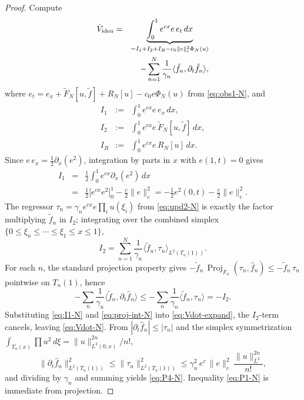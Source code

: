 \documentclass[journal,twoside,web]{ieeecolor}
\DeclareMathOperator{\Proj}{Proj}
\begin{document}
\begin{proof}
Compute
\begin{eqnarray}
\dot V_{\rm iden} &=& \underbrace{\int_0^1 e^{cx}e\,e_t\,dx}_{=I_1+I_2+I_R-c_0\|e\|_c^2\Phi_N(u)} \nonumber\\
&& -\sum_{n=1}^N\frac{1}{\gamma_n}\langle\tilde f_n,\partial_t\hat f_n\rangle, \label{eq:Vdot-expand}
\end{eqnarray}
where $e_t=e_x+\tilde F_N[u,\tilde f]+R_N[u]-c_0 e\Phi_N(u)$ from \eqref{eq:obs1-N}, and
\begin{eqnarray}
I_1 &:=& \int_0^1 e^{cx}e\,e_x\,dx, \nonumber\\
I_2 &:=& \int_0^1 e^{cx}e\,\tilde F_N[u,\tilde f]\,dx, \nonumber\\
I_R &:=& \int_0^1 e^{cx}e\,R_N[u]\,dx. \label{eq:I123-def}
\end{eqnarray}
 Since $e\,e_x=\tfrac12\partial_x(e^2)$, integration by parts in $x$ with $e(1,t)=0$ gives
\begin{eqnarray}
I_1 &=& \tfrac12\int_0^1 e^{cx}\partial_x(e^2)\,dx \nonumber\\
&=& \tfrac12\bigl[e^{cx}e^2\bigr]_0^1-\tfrac{c}{2}\|e\|_c^2=-\tfrac12 e^2(0,t)-\tfrac{c}{2}\|e\|_c^2. \label{eq:I1-N}
\end{eqnarray}
 The regressor $\tau_n=\gamma_n e^{cx}e\prod_i u(\xi_i)$ from \eqref{eq:upd2-N} is exactly the factor multiplying $\tilde f_n$ in $I_2$; integrating over the combined simplex $\{0\le\xi_n\le\cdots\le\xi_1\le x\le 1\}$,
\begin{equation}\label{eq:I2-N}
I_2=\sum_{n=1}^N\frac{1}{\gamma_n}\langle\tilde f_n,\tau_n\rangle_{L^2(T_n(1))}.
\end{equation}
 For each $n$, the standard projection property gives $-\tilde f_n\,\Proj_{\bar F_n}(\tau_n,\hat f_n)\le-\tilde f_n\,\tau_n$ pointwise on $T_n(1)$, hence
\begin{equation}\label{eq:proj-int-N}
-\sum_n\frac{1}{\gamma_n}\langle\tilde f_n,\partial_t\hat f_n\rangle\le-\sum_n\frac{1}{\gamma_n}\langle\tilde f_n,\tau_n\rangle=-I_2.
\end{equation}
 Substituting \eqref{eq:I1-N} and \eqref{eq:proj-int-N} into \eqref{eq:Vdot-expand}, the $I_2$-term cancels, leaving \eqref{eq:Vdot-N}.
 From $|\partial_t\hat f_n|\le|\tau_n|$ and the simplex symmetrization $\int_{T_n(x)}\prod u^2\,d\xi=\|u\|^{2n}_{L^2(0,x)}/n!$,
\begin{equation}\label{eq:tau-bound}
\|\partial_t\hat f_n\|^2_{L^2(T_n(1))}\le\|\tau_n\|^2_{L^2(T_n(1))}\le \gamma_n^2\,e^c\,\|e\|_c^2\,\frac{\|u\|^{2n}_{L^2}}{n!},
\end{equation}
and dividing by $\gamma_n$ and summing yields \eqref{eq:P4-N}. Inequality \eqref{eq:P1-N} is immediate from  projection.
\end{proof}
\end{document}
